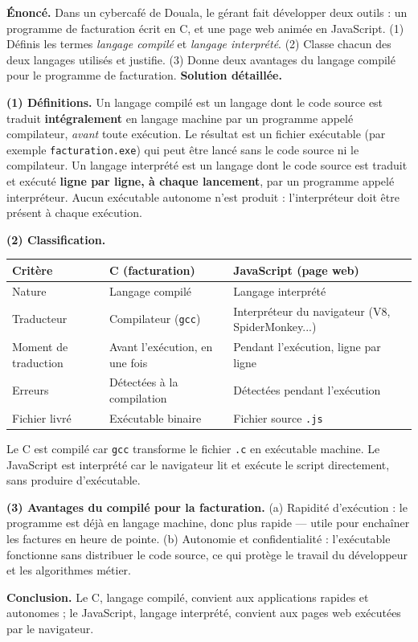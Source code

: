 \documentclass[11pt]{article}
\newcommand{\cle}[1]{{\popxbold\color{popdark}#1}}
\begin{document}
\begin{exoresolu}
\textbf{Énoncé.} Dans un cybercafé de Douala, le gérant fait développer deux outils : un programme de facturation écrit en C, et une page web animée en JavaScript. (1) Définis les termes \emph{langage compilé} et \emph{langage interprété}. (2) Classe chacun des deux langages utilisés et justifie. (3) Donne deux avantages du langage compilé pour le programme de facturation.
\tcblower
\textbf{Solution détaillée.}

\textbf{(1) Définitions.}
Un \cle{langage compilé} est un langage dont le code source est traduit \textbf{intégralement} en langage machine par un programme appelé \cle{compilateur}, \emph{avant} toute exécution. Le résultat est un \cle{fichier exécutable} (par exemple \texttt{facturation.exe}) qui peut être lancé sans le code source ni le compilateur.
Un \cle{langage interprété} est un langage dont le code source est traduit et exécuté \textbf{ligne par ligne, à chaque lancement}, par un programme appelé \cle{interpréteur}. Aucun exécutable autonome n'est produit : l'interpréteur doit être présent à chaque exécution.

\textbf{(2) Classification.}
\begin{center}
\begin{tabularx}{\linewidth}{|l|X|X|}
\hline
\rowcolor{popblueL} \textbf{Critère} & \textbf{C (facturation)} & \textbf{JavaScript (page web)} \\
\hline
Nature & Langage compilé & Langage interprété \\
\hline
Traducteur & Compilateur (\texttt{gcc}) & Interpréteur du navigateur (V8, SpiderMonkey...) \\
\hline
Moment de traduction & Avant l'exécution, en une fois & Pendant l'exécution, ligne par ligne \\
\hline
Erreurs & Détectées à la compilation & Détectées pendant l'exécution \\
\hline
Fichier livré & Exécutable binaire & Fichier source \texttt{.js} \\
\hline
\end{tabularx}
\end{center}
Le C est compilé car \texttt{gcc} transforme le fichier \texttt{.c} en exécutable machine. Le JavaScript est interprété car le navigateur lit et exécute le script directement, sans produire d'exécutable.

\textbf{(3) Avantages du compilé pour la facturation.} (a) \cle{Rapidité d'exécution} : le programme est déjà en langage machine, donc plus rapide — utile pour enchaîner les factures en heure de pointe. (b) \cle{Autonomie et confidentialité} : l'exécutable fonctionne sans distribuer le code source, ce qui protège le travail du développeur et les algorithmes métier.

\textbf{Conclusion.} Le C, langage compilé, convient aux applications rapides et autonomes ; le JavaScript, langage interprété, convient aux pages web exécutées par le navigateur.
\end{exoresolu}
\end{document}
